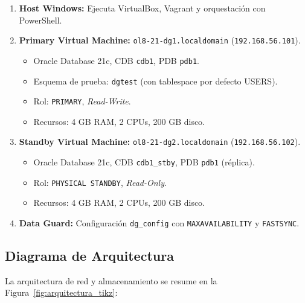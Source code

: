 \documentclass[11pt, a4paper]{report}
\begin{document}
\begin{enumerate}
    \item \textbf{Host Windows:} Ejecuta VirtualBox, Vagrant y orquestación con PowerShell.
\item \textbf{Primary Virtual Machine:} \texttt{ol8-21-dg1.localdomain} (\texttt{192.168.56.101}).
    \begin{itemize}
        \item Oracle Database 21c, CDB \texttt{cdb1}, PDB \texttt{pdb1}.
        \item Esquema de prueba: \texttt{dgtest} (con tablespace por defecto USERS).
\item Rol: \texttt{PRIMARY}, \textit{Read-Write}.
        \item Recursos: 4 GB RAM, 2 CPUs, 200 GB disco.
\end{itemize}
    \item \textbf{Standby Virtual Machine:} \texttt{ol8-21-dg2.localdomain} (\texttt{192.168.56.102}).
\begin{itemize}
        \item Oracle Database 21c, CDB \texttt{cdb1\_stby}, PDB \texttt{pdb1} (réplica).
\item Rol: \texttt{PHYSICAL STANDBY}, \textit{Read-Only}.
        \item Recursos: 4 GB RAM, 2 CPUs, 200 GB disco.
\end{itemize}
    \item \textbf{Data Guard:} Configuración \texttt{dg\_config} con \texttt{MAXAVAILABILITY} y \texttt{FASTSYNC}.
\end{enumerate}

\subsection{Diagrama de Arquitectura}
La arquitectura de red y almacenamiento se resume en la Figura~\ref{fig:arquitectura_tikz}:
\end{document}
